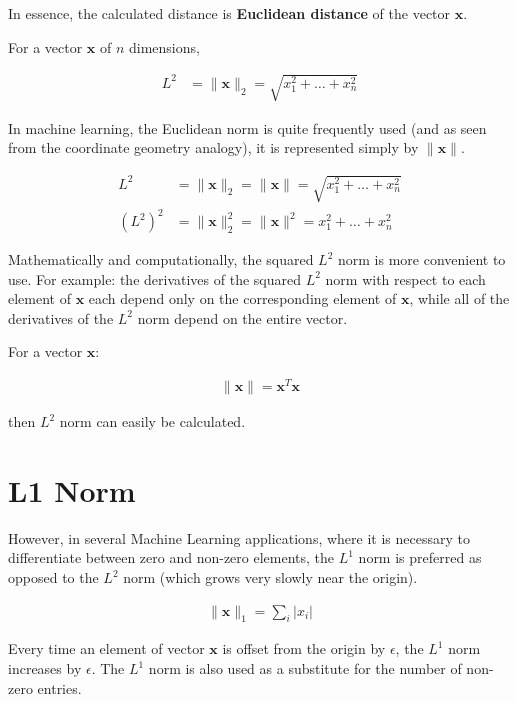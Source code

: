 In essence, the calculated distance is \textbf{Euclidean distance} of the vector \(\mathbf{x}\).
\para

For a vector \(\mathbf{x}\) of \(n\) dimensions,

\begin{align}
L^{2} &= \|\mathbf{x}\|_2 = \sqrt{x_{1}^2 + \dots + x_{n}^2}
\end{align}
\para

In machine learning, the Euclidean norm is quite frequently used (and as seen from the coordinate geometry analogy), it is represented simply by \(\|\mathbf{x}\|\).
\para

\begin{align}
L^{2} &= \|\mathbf{x}\|_2 = \|\mathbf{x}\| = \sqrt{x_{1}^2 + \dots + x_{n}^2} \\
\left( L^{2} \right) ^{2} &= \|\mathbf{x}\|_2^2 = \|\mathbf{x}\|^{2} = x_{1}^2 + \dots + x_{n}^2
\end{align}
\para

Mathematically and computationally, the squared \(L^{2}\) norm is more convenient to use. For example: the derivatives of the squared \(L^{2}\) norm with respect to each element of \(\mathbf{x}\) each depend only on the corresponding element of \(\mathbf{x}\), while all of the derivatives of the \(L^{2}\) norm depend on the entire vector.
\para

For a vector \(\mathbf{x}\):

\begin{align}
\|\mathbf{x}\| = \mathbf{x}^{T}\mathbf{x}
\end{align}
\para

then \(L^{2}\) norm can easily be calculated.

\clearpage
\newpage

\section{L1 Norm}

However, in several Machine Learning applications, where it is necessary to differentiate between zero and non-zero elements, the \(L^{1}\) norm is preferred as opposed to the \(L^{2}\) norm (which grows very slowly near the origin).
\para

\begin{align}
\|\mathbf{x}\|_{1} = \sum_{i} \left| x_{i} \right|
\end{align}
\para

Every time an element of vector \(\mathbf{x}\) is offset from the origin by \(\epsilon\), the \(L^{1}\) norm increases by \(\epsilon\). The \(L^{1}\) norm is also used as a substitute for the number of non-zero entries.


